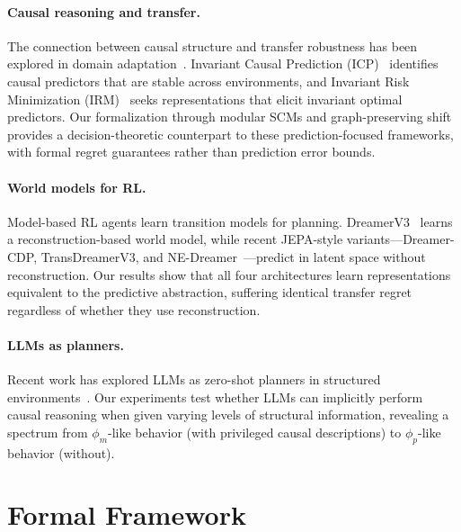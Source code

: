 \documentclass[runningheads]{llncs}
\newcommand{\phim}{\phi_m}
\newcommand{\phip}{\phi_p}
\begin{document}
\paragraph{Causal reasoning and transfer.} The connection between causal structure and transfer robustness has been explored in domain adaptation~\cite{scholkopf2021toward,peters2016causal}. Invariant Causal Prediction (ICP)~\cite{peters2016causal} identifies causal predictors that are stable across environments, and Invariant Risk Minimization (IRM)~\cite{arjovsky2019invariant} seeks representations that elicit invariant optimal predictors. Our formalization through modular SCMs and graph-preserving shift provides a decision-theoretic counterpart to these prediction-focused frameworks, with formal regret guarantees rather than prediction error bounds.

\paragraph{World models for RL.} Model-based RL agents learn transition models for planning. DreamerV3~\cite{hafner2023mastering} learns a reconstruction-based world model, while recent JEPA-style variants---Dreamer-CDP, TransDreamerV3, and NE-Dreamer~\cite{zenke2026reconstruction}---predict in latent space without reconstruction. Our results show that all four architectures learn representations equivalent to the predictive abstraction, suffering identical transfer regret regardless of whether they use reconstruction.

\paragraph{LLMs as planners.} Recent work has explored LLMs as zero-shot planners in structured environments~\cite{huang2022language,valmeekam2023planning}. Our experiments test whether LLMs can implicitly perform causal reasoning when given varying levels of structural information, revealing a spectrum from $\phim$-like behavior (with privileged causal descriptions) to $\phip$-like behavior (without).

\section{Formal Framework}
\label{sec:framework}
\end{document}
